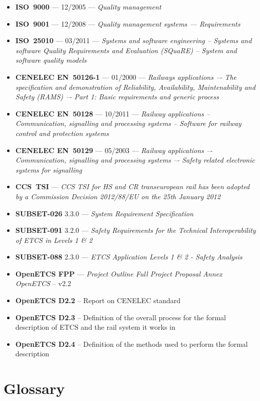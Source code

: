 \documentclass{template/openetcs_report}
\begin{document}
\begin{itemize}
\item \textbf{ISO~9000} --- 12/2005 --- \emph{Quality management}
\item \textbf{ISO~9001} --- 12/2008 --- \emph{Quality management systems — Requirements}
\item \textbf{ISO~25010} --- 03/2011 --- \emph{Systems and software engineering -- Systems and software Quality Requirements and Evaluation (SQuaRE) -- System and software quality models}
\item \textbf{CENELEC EN~50126-1} --- 01/2000 --- \emph{Railways applications –- The specification and 
demonstration of Reliability, Availability, Maintenability and Safety (RAMS) –- Part 1: 
Basic requirements and generic process}
\item \textbf{CENELEC EN~50128} --- 10/2011 --- \emph{Railway applications -- Communication, signalling and 
processing systems -- Software for railway control and protection systems}
\item \textbf{CENELEC EN~50129} --- 05/2003 --- \emph{Railway applications –- Communication, signalling and 
processing systems –- Safety related electronic systems for signalling}
\item \textbf{CCS~TSI} --- \emph{ CCS TSI for HS and CR transeuropean rail has been adopted by a Commission Decision 2012/88/EU on the 25th January 2012}
\item \textbf{SUBSET-026} 3.3.0 --- \emph{System Requirement Specification}
\item \textbf{SUBSET-091} 3.2.0 --- \emph{Safety Requirements for the Technical Interoperability
of ETCS in Levels 1 \& 2}
\item \textbf{SUBSET-088} 2.3.0 --- \emph{ETCS Application Levels 1 \& 2 - Safety Analysis}
\item \textbf{OpenETCS FPP} --- \emph{Project Outline Full Project Proposal Annex OpenETCS} -- v2.2
\item \textbf{OpenETCS D2.2} -- Report on CENELEC standard
\item \textbf{OpenETCS D2.3} -- Definition of the overall process for the formal description of ETCS and the rail system it works in 
\item \textbf{OpenETCS D2.4} -- Definition of the methods used to perform the formal description
\end{itemize}



\section{Glossary}
\label{sec:glossary}
\end{document}
